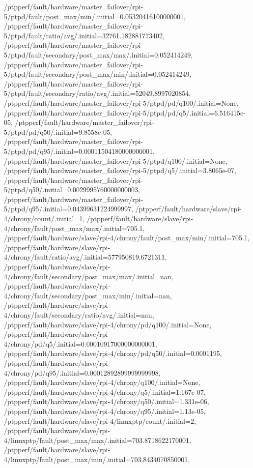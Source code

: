 {    /ptpperf/fault/hardware/master_failover/rpi-5/ptpd/fault/post_max/min/.initial=0.05320416100000001,
    /ptpperf/fault/hardware/master_failover/rpi-5/ptpd/fault/ratio/avg/.initial=32761.182881773402,
    /ptpperf/fault/hardware/master_failover/rpi-5/ptpd/fault/secondary/post_max/max/.initial=0.052414249,
    /ptpperf/fault/hardware/master_failover/rpi-5/ptpd/fault/secondary/post_max/min/.initial=0.052414249,
    /ptpperf/fault/hardware/master_failover/rpi-5/ptpd/fault/secondary/ratio/avg/.initial=52049.8997020854,
    /ptpperf/fault/hardware/master_failover/rpi-5/ptpd/pd/q100/.initial=None,
    /ptpperf/fault/hardware/master_failover/rpi-5/ptpd/pd/q5/.initial=6.516415e-05,
    /ptpperf/fault/hardware/master_failover/rpi-5/ptpd/pd/q50/.initial=9.8558e-05,
    /ptpperf/fault/hardware/master_failover/rpi-5/ptpd/pd/q95/.initial=0.00011504180000000001,
    /ptpperf/fault/hardware/master_failover/rpi-5/ptpd/q100/.initial=None,
    /ptpperf/fault/hardware/master_failover/rpi-5/ptpd/q5/.initial=3.8065e-07,
    /ptpperf/fault/hardware/master_failover/rpi-5/ptpd/q50/.initial=0.0029995760000000003,
    /ptpperf/fault/hardware/master_failover/rpi-5/ptpd/q95/.initial=0.04399631224999997,
    /ptpperf/fault/hardware/slave/rpi-4/chrony/count/.initial=1,
    /ptpperf/fault/hardware/slave/rpi-4/chrony/fault/post_max/max/.initial=705.1,
    /ptpperf/fault/hardware/slave/rpi-4/chrony/fault/post_max/min/.initial=705.1,
    /ptpperf/fault/hardware/slave/rpi-4/chrony/fault/ratio/avg/.initial=577950819.6721311,
    /ptpperf/fault/hardware/slave/rpi-4/chrony/fault/secondary/post_max/max/.initial=nan,
    /ptpperf/fault/hardware/slave/rpi-4/chrony/fault/secondary/post_max/min/.initial=nan,
    /ptpperf/fault/hardware/slave/rpi-4/chrony/fault/secondary/ratio/avg/.initial=nan,
    /ptpperf/fault/hardware/slave/rpi-4/chrony/pd/q100/.initial=None,
    /ptpperf/fault/hardware/slave/rpi-4/chrony/pd/q5/.initial=0.00010917000000000001,
    /ptpperf/fault/hardware/slave/rpi-4/chrony/pd/q50/.initial=0.0001195,
    /ptpperf/fault/hardware/slave/rpi-4/chrony/pd/q95/.initial=0.00012892899999999998,
    /ptpperf/fault/hardware/slave/rpi-4/chrony/q100/.initial=None,
    /ptpperf/fault/hardware/slave/rpi-4/chrony/q5/.initial=1.167e-07,
    /ptpperf/fault/hardware/slave/rpi-4/chrony/q50/.initial=1.331e-06,
    /ptpperf/fault/hardware/slave/rpi-4/chrony/q95/.initial=1.13e-05,
    /ptpperf/fault/hardware/slave/rpi-4/linuxptp/count/.initial=2,
    /ptpperf/fault/hardware/slave/rpi-4/linuxptp/fault/post_max/max/.initial=703.8718622170001,
    /ptpperf/fault/hardware/slave/rpi-4/linuxptp/fault/post_max/min/.initial=703.8434070850001,
}
